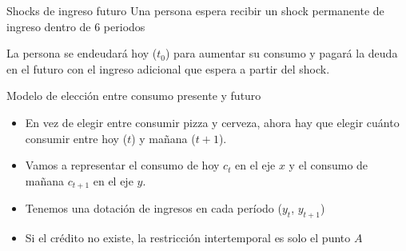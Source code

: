 \documentclass{beamer}
\begin{document}
\begin{frame}{Shocks de ingreso futuro}
\small Una persona espera recibir un shock permanente de ingreso dentro de 6 periodos 
\begin{center}
\begin{figure}[H]
\begin{center}
\end{center}
\end{figure}
\end{center}  
\vspace{-1mm}
\small La persona se endeudará hoy ($t_0$) para aumentar su consumo y pagará la deuda en el futuro con el ingreso adicional que espera a partir del shock.
\end{frame}


\begin{frame}{Modelo de elección entre consumo presente y futuro}
    \begin{itemize} \small
        \item En vez de elegir entre consumir pizza y cerveza, ahora hay que elegir cuánto consumir entre hoy ($t$) y mañana ($t+1$).
        \item Vamos a representar el consumo de hoy $c_t$ en el eje $x$ y el consumo de mañana $c_{t+1}$ en el eje $y$. 
        \item Tenemos una dotación de ingresos en cada período ($y_t$, $y_{t+1}$)
        \item Si el crédito no existe, la restricción intertemporal es solo el punto $A$
    \end{itemize}

\begin{center}
\begin{figure}[h!]
\begin{center}
\end{center}
\end{figure}
\end{center}  
\end{frame}
\end{document}
